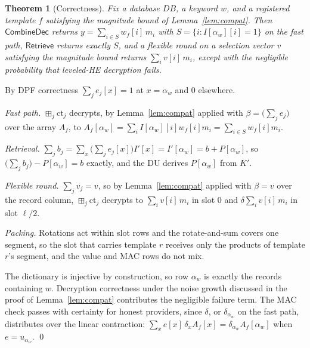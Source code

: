 \documentclass[a4paper,fleqn]{cas-dc}
\newtheorem{theorem}{Theorem}
\newcommand{\bplus}{\boxplus}
\begin{document}
\begin{theorem}[Correctness]
\label{thm:correct}
Fix a database $DB$, a keyword $w$, and a registered template $f$ satisfying
the magnitude bound of Lemma~\ref{lem:compat}. Then $\mathsf{CombineDec}$
returns $y=\sum_{i\in S} w_f[i]\,m_i$ with $S=\{i: I[\alpha_w][i]=1\}$ on the
fast path, $\mathsf{Retrieve}$ returns exactly $S$, and a flexible round on a
selection vector $v$ satisfying the magnitude bound returns
$\sum_i v[i]\,m_i$, except with the negligible probability that leveled-HE
decryption fails.
\end{theorem}
\begin{pf}
By DPF correctness $\sum_j e_j[x]=1$ at $x=\alpha_w$ and $0$ elsewhere.

\emph{Fast path.} $\bplus_j\text{ct}_j$ decrypts, by Lemma~\ref{lem:compat}
applied with $\beta=\big(\sum_j e_j\big)$ over the array $A_f$, to
$A_f[\alpha_w]=\sum_i I[\alpha_w][i]w_f[i]m_i=\sum_{i\in S}w_f[i]m_i$.

\emph{Retrieval.} $\sum_j b_j=\sum_x\big(\sum_j e_j[x]\big)
I'[x]=I'[\alpha_w]=b+P[\alpha_w]$, so $\big(\sum_j b_j\big)-P[\alpha_w]=b$
exactly, and the DU derives $P[\alpha_w]$ from $K'$.

\emph{Flexible round.} $\sum_j v_j=v$, so by Lemma~\ref{lem:compat} applied
with $\beta=v$ over the record column, $\bplus_j\text{ct}_j$ decrypts to
$\sum_i v[i]\,m_i$ in slot $0$ and $\delta\sum_i v[i]\,m_i$ in slot $\ell/2$.

\emph{Packing.} Rotations act within slot rows and the rotate-and-sum covers
one segment, so the slot that carries template $r$ receives only the products
of template $r$'s segment, and the value and MAC rows do not mix.

The dictionary is injective by construction, so row $\alpha_w$ is exactly the
records containing $w$. Decryption correctness under the noise growth
discussed in the proof of Lemma~\ref{lem:compat} contributes the negligible
failure term. The MAC check passes with certainty for honest providers, since
$\delta$, or $\delta_{\alpha_w}$ on the fast path, distributes over the linear
contraction: $\sum_x e[x]\,\delta_xA_f[x]=\delta_{\alpha_w}A_f[\alpha_w]$ when
$e=u_{\alpha_w}$. \qed
\end{pf}
\end{document}
